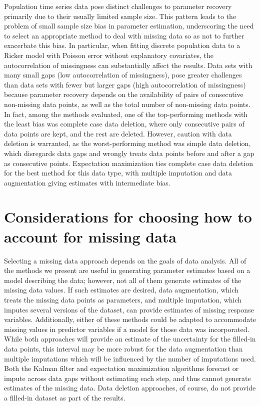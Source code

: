 \documentclass{article}
\begin{document}
Population time series data pose distinct challenges to parameter recovery primarily due to their usually limited sample size. This pattern leads to the problem of small sample size bias in parameter estimation, underscoring the need to select an appropriate method to deal with missing data so as not to further exacerbate this bias. In particular, when fitting discrete population data to a Ricker model with Poisson error without explanatory covariates, the autocorrelation of missingness can substantially affect the results. Data sets with many small gaps (low autocorrelation of missingness), pose greater challenges than data sets with fewer but larger gaps (high autocorrelation of missingness) because parameter recovery depends on the availability of pairs of consecutive non-missing data points, as well as the total number of non-missing data points. In fact, among the methods evaluated, one of the top-performing methods with the least bias was complete case data deletion, where only consecutive pairs of data points are kept, and the rest are deleted. However, caution with data deletion is warranted, as the worst-performing method was simple data deletion, which disregards data gaps and wrongly treats data points before and after a gap as consecutive points. Expectation maximization ties complete case data deletion for the best method for this data type, with multiple imputation and data augmentation giving estimates with intermediate bias.



\section*{Considerations for choosing how to account for missing data}

Selecting a missing data approach depends on the goals of data analysis. All of the methods we present are useful in generating parameter estimates based on a model describing the data; however, not all of them generate estimates of the missing data values. If such estimates are desired, data augmentation, which treats the missing data points as parameters, and multiple imputation, which imputes several versions of the dataset, can provide estimates of missing response variables. Additionally, either of these methods could be adapted to accommodate missing values in predictor variables if a model for those data was incorporated. While both approaches will provide an estimate of the uncertainty for the filled-in data points, this interval may be more robust for the data augmentation than multiple imputations which will be influenced by the number of imputations used. Both the Kalman filter and expectation maximization algorithms forecast or impute across data gaps without estimating each step, and thus cannot generate estimates of the missing data. Data deletion approaches, of course, do not provide a filled-in dataset as part of the results. 
\end{document}
